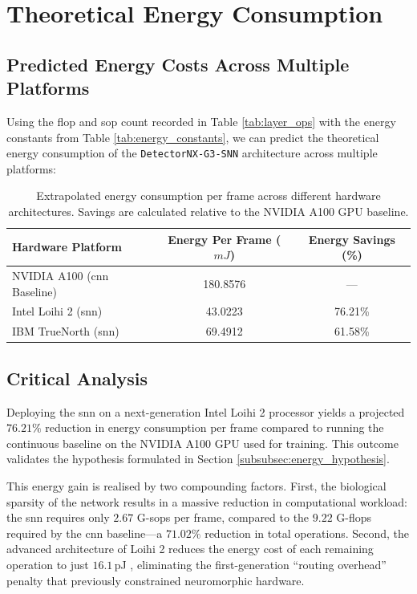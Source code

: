 \section{Theoretical Energy Consumption}

\subsection*{Predicted Energy Costs Across Multiple Platforms}

Using the \gls{flop} and \gls{sop} count recorded in Table \ref{tab:layer_ops} with the energy constants from Table \ref{tab:energy_constants}, we can predict the theoretical energy consumption of the \texttt{DetectorNX-G3-SNN} architecture across multiple platforms:

\begin{table}[htbp]
\centering
\begin{tabular}{|l|c|c|}
\hline
\textbf{Hardware Platform} & \textbf{Energy Per Frame ($mJ$)} & \textbf{Energy Savings (\%)} \\
\hline
NVIDIA A100 (\gls{cnn} Baseline) & 180.8576 & --- \\
Intel Loihi 2 (\gls{snn}) & 43.0223 & 76.21\% \\
IBM TrueNorth (\gls{snn}) & 69.4912 & 61.58\% \\
\hline
\end{tabular}
\caption[Neuromorphic Hardware Energy Extrapolation]{Extrapolated energy consumption per frame across different hardware architectures. Savings are calculated relative to the NVIDIA A100 GPU baseline.}
\label{tab:hardware_extrapolation}
\end{table}

\subsection*{Critical Analysis}

Deploying the \gls{snn} on a next-generation Intel Loihi 2 processor yields a projected $76.21\%$ reduction in energy consumption per frame compared to running the continuous baseline on the NVIDIA A100 GPU used for training. This outcome validates the hypothesis formulated in Section \ref{subsubsec:energy_hypothesis}.

This energy gain is realised by two compounding factors. 
First, the biological sparsity of the network results in a massive reduction in computational workload: the \gls{snn} requires only $2.67$ G-\glspl{sop} per frame, compared to the $9.22$ G-\glspl{flop} required by the \gls{cnn} baseline---a $71.02\%$ reduction in total operations. 
Second, the advanced architecture of Loihi 2 reduces the energy cost of each remaining operation to just $16.1$\,pJ \cite{gralewicz2024spikes}, eliminating the first-generation ``routing overhead'' penalty that previously constrained neuromorphic hardware.

